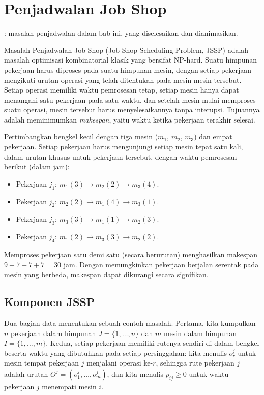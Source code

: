 \newpage





\section{Penjadwalan Job Shop}
\label{sec:job-shop}

\begin{tryit}
: masalah penjadwalan dalam bab ini, yang diselesaikan dan dianimasikan.
\end{tryit}


Masalah Penjadwalan Job Shop (Job Shop Scheduling Problem, JSSP) adalah masalah optimisasi kombinatorial klasik yang bersifat NP-hard.
Suatu himpunan pekerjaan harus diproses pada suatu himpunan mesin, dengan setiap pekerjaan mengikuti urutan operasi yang telah ditentukan pada mesin-mesin tersebut.
Setiap operasi memiliki waktu pemrosesan tetap, setiap mesin hanya dapat menangani satu pekerjaan pada satu waktu, dan setelah mesin mulai memproses suatu operasi, mesin tersebut harus menyelesaikannya tanpa interupsi.
Tujuannya adalah meminimumkan \emph{makespan}, yaitu waktu ketika pekerjaan terakhir selesai.

Pertimbangkan bengkel kecil dengan tiga mesin ($m_1$, $m_2$, $m_3$) dan empat pekerjaan.
Setiap pekerjaan harus mengunjungi setiap mesin tepat satu kali, dalam urutan khusus untuk pekerjaan tersebut, dengan waktu pemrosesan berikut (dalam jam):

\begin{itemize}
  \item Pekerjaan $j_1$: $m_1(3) \to m_2(2) \to m_3(4)$.
  \item Pekerjaan $j_2$: $m_2(2) \to m_1(4) \to m_3(1)$.
  \item Pekerjaan $j_3$: $m_3(3) \to m_1(1) \to m_2(3)$.
  \item Pekerjaan $j_4$: $m_1(2) \to m_3(3) \to m_2(2)$.
\end{itemize}

Memproses pekerjaan satu demi satu (secara berurutan) menghasilkan makespan $9+7+7+7 = 30$ jam.
Dengan memungkinkan pekerjaan berjalan serentak pada mesin yang berbeda, makespan dapat dikurangi secara signifikan.

\subsection{Komponen JSSP}
Dua bagian data menentukan sebuah contoh masalah.
Pertama, kita kumpulkan $n$ pekerjaan dalam himpunan $J = \{1, \ldots, n\}$ dan $m$ mesin dalam himpunan $I = \{1, \ldots, m\}$.
Kedua, setiap pekerjaan memiliki rutenya sendiri di dalam bengkel beserta waktu yang dibutuhkan pada setiap persinggahan: kita menulis $o_r^j$ untuk mesin tempat pekerjaan $j$ menjalani operasi ke-$r$, sehingga rute pekerjaan $j$ adalah urutan $O^j = (o_1^j, \ldots, o_m^j)$, dan kita menulis $p_{ij} \geq 0$ untuk waktu pekerjaan $j$ menempati mesin $i$.

